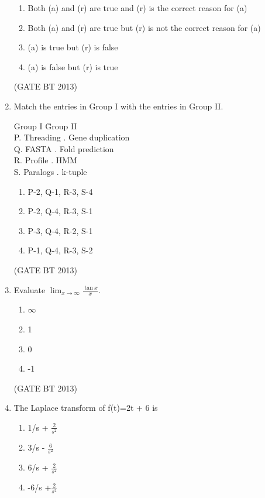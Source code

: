 \documentclass[journal,12pt,onecolumn]{IEEEtran}
\theoremstyle{remark}
\begin{document}
\begin{enumerate}
\begin{enumerate}[label=(\Alph*)]
    \item Both (a) and (r) are true and (r) is the correct reason for (a)
    \item Both (a) and (r) are true but (r) is not the correct reason for (a)
    \item (a) is true but (r) is false
    \item (a) is false but (r) is true
\end{enumerate} \hfill(GATE BT 2013)

\item 

Match the entries in Group I with the entries in Group II.

\begin{tabbing}
Group I \hspace{3.5cm} \= Group II \\
P. Threading . Gene duplication \\
Q. FASTA . Fold prediction \\
R. Profile . HMM \\
S. Paralogs . k-tuple \\
\end{tabbing}

\begin{enumerate}[label=(\Alph*)]
    \item P-2, Q-1, R-3, S-4
    \item P-2, Q-4, R-3, S-1
    \item P-3, Q-4, R-2, S-1
    \item P-1, Q-4, R-3, S-2
\end{enumerate} \hfill(GATE BT 2013)

\item 

Evaluate \(\displaystyle \lim_{x \to \infty} \frac{\tan x}{x}\).

\begin{enumerate}[label=(\Alph*)]
    \item \(\infty\)
    \item 1
    \item 0
    \item -1
\end{enumerate} \hfill(GATE BT 2013)

\item 

The Laplace transform of f(t)=2t + 6 is 

\begin{enumerate}
    \item 1/s + \( \frac{2}{s^2} \)
    \item 3/s - \(\frac{6}{s^2}\)
    \item 6/s + \(\frac{2}{s^2}\)
    \item -6/s +\(\frac{2}{s^2}\)


\end{enumerate}
\end{enumerate}
\end{document}
